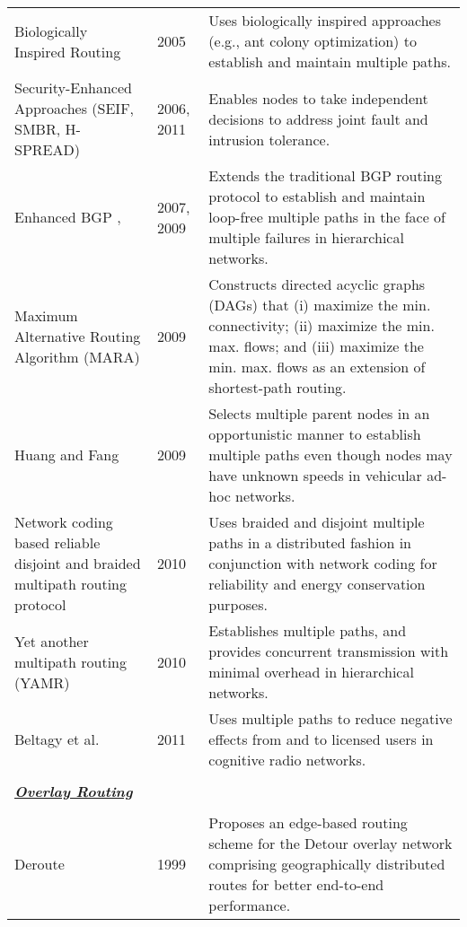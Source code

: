 \documentclass[10pt]{IEEEtran}
\begin{document}
\begin{table*}[!ht]
\begin{tabular}{p{5.5cm}p{1cm}p{10cm}}
Biologically Inspired Routing \cite{di2005anthocnet, ducatelle2005ant} & 2005 & Uses biologically inspired approaches (e.g., ant colony optimization) to establish and maintain multiple paths. \\
Security-Enhanced Approaches (SEIF, SMBR, H-SPREAD) & 2006, 2011 & Enables nodes to take independent decisions to address joint fault and intrusion tolerance. \\
Enhanced BGP \cite{kushman2007r}, \cite{van2009loop} & 2007, 2009 &  Extends the traditional BGP routing protocol to establish and maintain loop-free multiple paths in the face of multiple failures in hierarchical networks. \\
Maximum Alternative Routing Algorithm (MARA) \cite{ohara2009mara} & 2009 & Constructs directed acyclic graphs (DAGs) that (i) maximize the min. connectivity; (ii) maximize the min. max. flows; and (iii) maximize the min. max. flows as an extension of shortest-path routing.\\
Huang and Fang \cite{huang2009performance} & 2009 & Selects multiple parent nodes in an opportunistic manner to establish multiple paths even though nodes may have unknown speeds in vehicular ad-hoc networks. \\
Network coding based reliable disjoint and braided multipath routing protocol \cite{yang2010network} & 2010 & Uses braided and disjoint multiple paths in a distributed fashion in conjunction with network coding for reliability and energy conservation purposes. \\



Yet another multipath routing (YAMR) \cite{ganichev2010yamr} & 2010 &  Establishes multiple paths, and provides concurrent transmission with minimal overhead in hierarchical networks. \\
Beltagy et al. \cite{beltagy2011new} & 2011 & Uses multiple paths to reduce negative effects from and to licensed users in cognitive radio networks.\\

\\
\multicolumn{2}{l}{\textbf{\underline{\emph{Overlay Routing}}}}\\
\\

Deroute \cite{savage1999end} & 1999 & Proposes an edge-based routing scheme for the Detour overlay network comprising geographically distributed routes for better end-to-end performance. \\


\end{tabular}
\end{table*}
\end{document}
